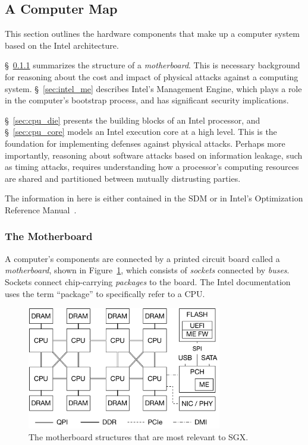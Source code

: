 \subsection{A Computer Map}
\label{sec:computer_map}

This section outlines the hardware components that make up a computer system
based on the Intel architecture.

\S~\ref{sec:motherboard} summarizes the structure of a \textit{motherboard}.
This is necessary background for reasoning about the cost and impact of
physical attacks against a computing system. \S~\ref{sec:intel_me} describes
Intel's Management Engine, which plays a role in the computer's bootstrap
process, and has significant security implications.

\S~\ref{sec:cpu_die} presents the building blocks of an Intel processor, and
\S~\ref{sec:cpu_core} models an Intel execution core at a high level. This is
the foundation for implementing defenses against physical attacks. Perhaps more
importantly, reasoning about software attacks based on information leakage,
such as timing attacks, requires understanding how a processor's computing
resources are shared and partitioned between mutually distrusting parties.

The information in here is either contained in the SDM or in Intel's
Optimization Reference Manual~\cite{intel2014optimization}.


\subsubsection{The Motherboard}
\label{sec:motherboard}

A computer's components are connected by a printed circuit board called a
\textit{motherboard}, shown in Figure~\ref{fig:motherboard}, which consists of
\textit{sockets} connected by \textit{buses}. Sockets connect chip-carrying
\textit{packages} to the board. The Intel documentation uses the term
``package'' to specifically refer to a CPU.

\begin{figure}[hbt]
  \centering
  \includegraphics[width=85mm]{figures/motherboard.pdf}
  \caption{
    The motherboard structures that are most relevant to SGX.
  }
  \label{fig:motherboard}
\end{figure}

